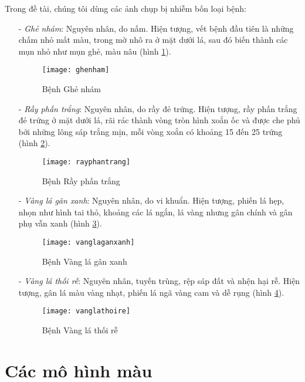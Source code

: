 Trong đề tài, chúng tôi dùng các ảnh chụp bị nhiễm bốn loại bệnh:
\begin{enumerate}
	\item[-] \emph{Ghẻ nhám}: Nguyên nhân, do nấm. Hiện tượng, vết bệnh đầu tiên là những chấm nhỏ mất màu, trong mờ nhô ra ở mặt dưới lá, sau đó biến thành các mụn nhỏ như mụn ghẻ, màu nâu (hình \ref{fig:benh-ghe-nham}).
	
\begin{figure}[h]
	\centering
	\texttt{[image: ghenham]}
	\caption{Bệnh Ghẻ nhám}
	\label{fig:benh-ghe-nham}
\end{figure}	
	
	\item[-] \emph{ Rầy phấn trắng}: Nguyên nhân, do rầy đẻ trứng. Hiện tượng, rầy phấn trắng đẻ trứng ở mặt dưới lá, rãi rác thành vòng tròn hình xoắn ốc và được che phủ bởi những lông sáp trắng mịn, mỗi vòng xoắn có khoảng 15 đến 25 trứng (hình \ref{fig:benh-ray-phan-trang}).
	
\begin{figure}[h]
	\centering
	\texttt{[image: rayphantrang]}
	\caption{Bệnh Rầy phấn trắng}
	\label{fig:benh-ray-phan-trang}
\end{figure}		
	
	\item[-] \emph{Vàng lá gân xanh}: Nguyên nhân, do vi khuẩn. Hiện tượng, phiến lá hẹp, nhọn như hình tai thỏ, khoảng các lá ngắn, lá vàng nhưng gân chính và gân phụ vẫn xanh (hình \ref{fig:benh-vang-la-gan-xanh}).
	
\begin{figure}[!h]
	\centering
	\texttt{[image: vanglaganxanh]}
	\caption{Bệnh Vàng lá gân xanh}
	\label{fig:benh-vang-la-gan-xanh}
\end{figure}		
	
	\item[-] \emph{Vàng lá thối rễ}: Nguyên nhân, tuyến trùng, rệp sáp đất và nhện hại rễ. Hiện tượng, gân lá màu vàng nhạt, phiến lá ngã vàng cam và dễ rụng (hình \ref{fig:benh-vang-la-thoi-re}).
	
\begin{figure}[h]
	\centering
	\texttt{[image: vanglathoire]}
	\caption{Bệnh Vàng lá thối rễ}
	\label{fig:benh-vang-la-thoi-re}
\end{figure}		
	
\end{enumerate}


\section{Các mô hình màu}
